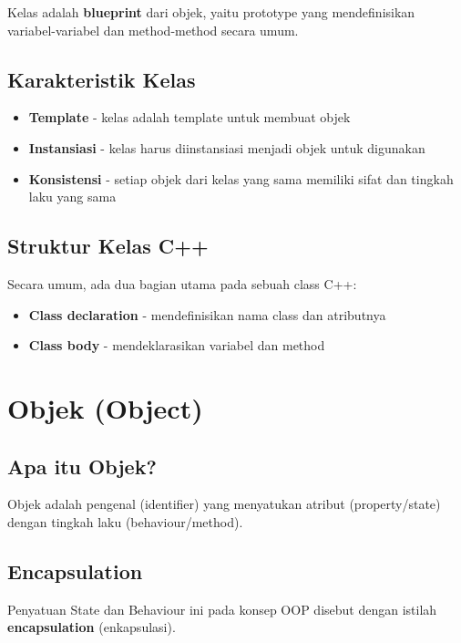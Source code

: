 Kelas adalah \textbf{blueprint} dari objek, yaitu prototype yang mendefinisikan variabel-variabel dan method-method secara umum.

\subsection{Karakteristik Kelas}

\begin{itemize}
\item \textbf{Template} - kelas adalah template untuk membuat objek
\item \textbf{Instansiasi} - kelas harus diinstansiasi menjadi objek untuk digunakan
\item \textbf{Konsistensi} - setiap objek dari kelas yang sama memiliki sifat dan tingkah laku yang sama
\end{itemize}

\subsection{Struktur Kelas C++}

Secara umum, ada dua bagian utama pada sebuah class C++:
\begin{itemize}
\item \textbf{Class declaration} - mendefinisikan nama class dan atributnya
\item \textbf{Class body} - mendeklarasikan variabel dan method
\end{itemize}

\section{Objek (Object)}\label{object}

\subsection{Apa itu Objek?}

Objek adalah pengenal (identifier) yang menyatukan atribut (property/state) dengan tingkah laku (behaviour/method).

\subsection{Encapsulation}

Penyatuan State dan Behaviour ini pada konsep OOP disebut dengan istilah \textbf{encapsulation} (enkapsulasi).

